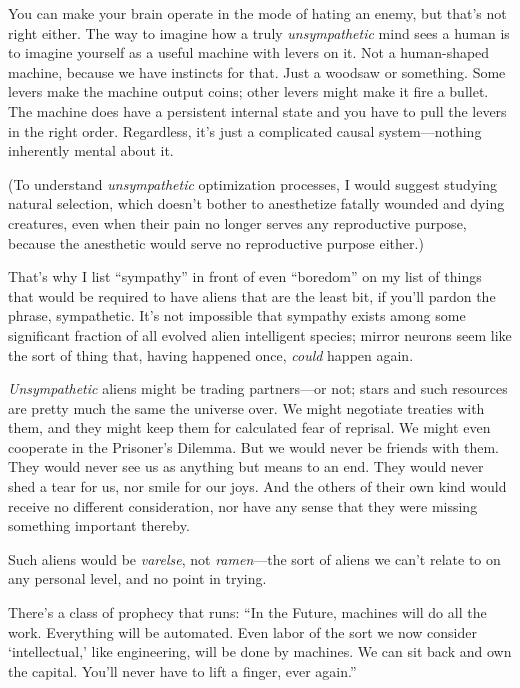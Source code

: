 {
 You can make your brain operate in the mode of hating an enemy,
but that's not right either. The way to imagine how a
truly \textit{unsympathetic} mind sees a human is to imagine yourself
as a useful machine with levers on it. Not a human-shaped machine,
because we have instincts for that. Just a woodsaw or something. Some
levers make the machine output coins; other levers might make it fire a
bullet. The machine does have a persistent internal state and you have
to pull the levers in the right order. Regardless, it's
just a complicated causal system---nothing inherently mental about it.}

{
 (To understand \textit{unsympathetic} optimization processes, I
would suggest studying natural selection, which doesn't
bother to anesthetize fatally wounded and dying creatures, even when
their pain no longer serves any reproductive purpose, because the
anesthetic would serve no reproductive purpose either.)}

{
 That's why I list
``sympathy'' in front of even
``boredom'' on my list of things
that would be required to have aliens that are the least bit, if
you'll pardon the phrase, sympathetic.
It's not impossible that sympathy exists among some
significant fraction of all evolved alien intelligent species; mirror
neurons seem like the sort of thing that, having happened once,
\textit{could} happen again.}

{
 \textit{Unsympathetic} aliens might be trading partners---or not;
stars and such resources are pretty much the same the universe over. We
might negotiate treaties with them, and they might keep them for
calculated fear of reprisal. We might even cooperate in the
Prisoner's Dilemma. But we would never be friends with
them. They would never see us as anything but means to an end. They
would never shed a tear for us, nor smile for our joys. And the others
of their own kind would receive no different consideration, nor have
any sense that they were missing something important thereby.}

{
 Such aliens would be \textit{varelse}, not \textit{ramen}{}---the
sort of aliens we can't relate to on any personal
level, and no point in trying.}

\myendsectiontext


{
 There's a class of prophecy that runs:
``In the Future, machines will do all the work.
Everything will be automated. Even labor of the sort we now consider
`intellectual,' like engineering, will
be done by machines. We can sit back and own the capital.
You'll never have to lift a finger, ever
again.'' }

